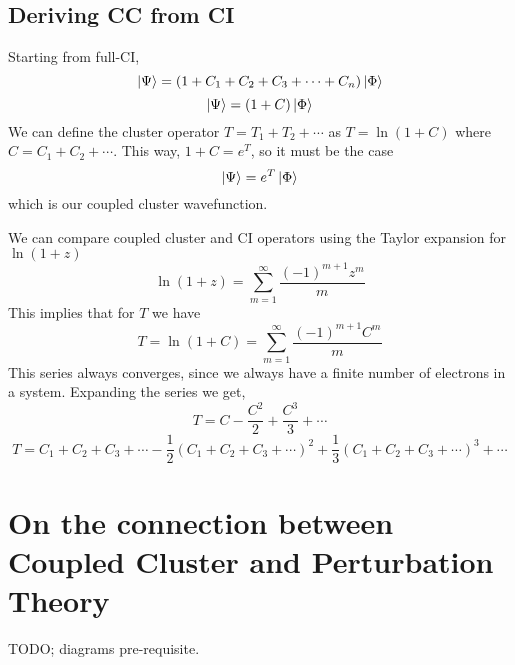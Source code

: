 \documentclass{article}
\newcommand{\lp}{\left(}
\newcommand{\rp}{\right)}
\begin{document}
\subsection{Deriving CC from CI}
Starting from full-CI,
\[ \ket{\Psi} = \lp 1 + C_1 + C_2 + C_3 + \cdots + C_n \rp \ket{\Phi} \]
\[ \ket{\Psi} = \lp 1 + C \rp \ket{\Phi} \]
We can define the cluster operator $T = T_1 + T_2 + \cdots$ as $T = \ln(1+C)$ where $C = C_1 + C_2 + \cdots$.
This way, $1 + C = e^T$, so it must be the case 
\[\ket{\Psi} = e^T \ket{\Phi} \]
which is our coupled cluster wavefunction.

We can compare coupled cluster and CI operators using the Taylor expansion for $\ln (1 + z)$
\[ \ln (1 + z) = \sum_{m=1}^{\infty} \frac{ (-1)^{m+1}  z^m}{ m} \]
This implies that for $T$ we have 
\[ T = \ln (1 + C) = \sum_{m=1}^{\infty} \frac{(-1)^{m+1}  C^m}{m} \]
This series always converges, since we always have a finite number of electrons in a system.
Expanding the series we get,
\[T = C - \frac{C^2}{2} + \frac{C^3}{3} + \cdots \]
\[T = C_1 + C_2 + C_3 + \cdots -  \frac{1}{2} ( C_1 + C_2 + C_3 + \cdots)^2 +  
  \frac{1}{3} (C_1 + C_2 + C_3 + \cdots)^3 +  \cdots
\]



\section{On the connection between Coupled Cluster and Perturbation Theory}
TODO; diagrams pre-requisite.
\end{document}
